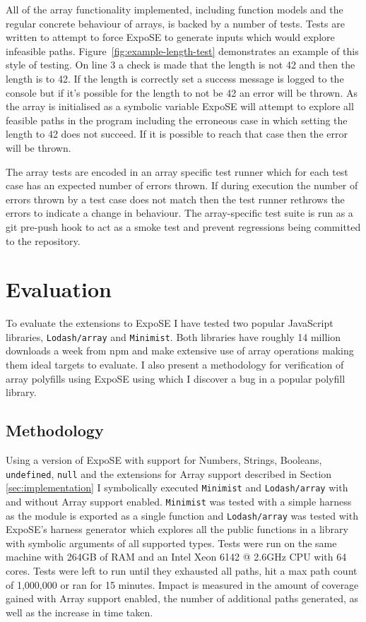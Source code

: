 \documentclass[]{final_report}
\begin{document}
All of the array functionality implemented, including function models and the regular concrete behaviour of arrays, is backed by a number of tests. Tests are written to attempt to force ExpoSE to generate inputs which would explore infeasible paths. Figure~\ref{fig:example-length-test} demonstrates an example of this style of testing. On line 3 a check is made that the length is not 42 and then the length is to 42. If the length is correctly set a success message is logged to the console but if it's possible for the length to not be 42 an error will be thrown. As the array is initialised as a symbolic variable ExpoSE will attempt to explore all feasible paths in the program including the erroneous case in which setting the length to 42 does not succeed. If it is possible to reach that case then the error will be thrown.

The array tests are encoded in an array specific test runner which for each test case has an expected number of errors thrown. If during execution the number of errors thrown by a test case does not match then the test runner rethrows the errors to indicate a change in behaviour. The array-specific test suite is run as a git pre-push hook to act as a smoke test and prevent regressions being committed to the repository.

\chapter{Evaluation}
To evaluate the extensions to ExpoSE I have tested two popular JavaScript libraries, \lstinline|Lodash/array| and \lstinline|Minimist|. Both libraries have roughly 14 million downloads a week from npm and make extensive use of array operations making them ideal targets to evaluate. I also present a methodology for verification of array polyfills using ExpoSE using which I discover a bug in a popular polyfill library.

\section{Methodology}
Using a version of ExpoSE with support for Numbers, Strings, Booleans, \lstinline|undefined|, \lstinline|null| and the extensions for Array support described in Section \ref{sec:implementation} I symbolically executed \lstinline|Minimist| and \lstinline|Lodash/array| with and without Array support enabled. \lstinline|Minimist| was tested with a simple harness as the module is exported as a single function and \lstinline|Lodash/array| was tested with ExpoSE's harness generator which explores all the public functions in a library with symbolic arguments of all supported types. Tests were run on the same machine with 264GB of RAM and an Intel Xeon 6142 @ 2.6GHz CPU with 64 cores. Tests were left to run until they exhausted all paths, hit a max path count of 1,000,000 or ran for 15 minutes. Impact is measured in the amount of coverage gained with Array support enabled, the number of additional paths generated, as well as the increase in time taken.
\end{document}
